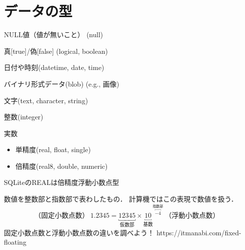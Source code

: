 \newcommand{\Draft}{}
\newcommand{\Slide}{}
\newcommand{\PrintLecture}{1}
\newcommand{\PrintSolution}{1}








\maketitle

\MyFrame{}{\tableofcontents}

\section{データの型}

\MyFrame{\insertsection}
{
  \begin{description}[浮動小数点型]
    \item [NULL型] NULL値（値が無いこと） (null) 
    \item [論理型] 真[true]/偽[false] (logical, boolean) 
    \item [日時型] 日付や時刻(datetime, date, time) 
    \item [バイナリ型] バイナリ形式データ(blob) (e.g., 画像) 
    \item [文字列型] 文字(text, character, string) 
    \item [整数型] 整数(integer)
    \item [浮動小数点型] 実数
      \begin{itemize}
        \item 単精度(real, float, single)
        \item 倍精度(real8, double, numeric)
      \end{itemize}
  \end{description}
  SQLiteのREALは倍精度浮動小数点型
}

{
  数値を整数部と指数部で表わしたもの．
  計算機ではこの表現で数値を扱う．
  \[（固定小数点数）~1.2345=\underbracket{12345}_{仮数部}\times {\underbracket{10}_{基数}}^{\overbracket{-4}^{指数部}}~（浮動小数点数）\]
  \MyRef
  {固定小数点数と浮動小数点数の違いを調べよう！}
  {https://itmanabi.com/fixed-floating}
}

